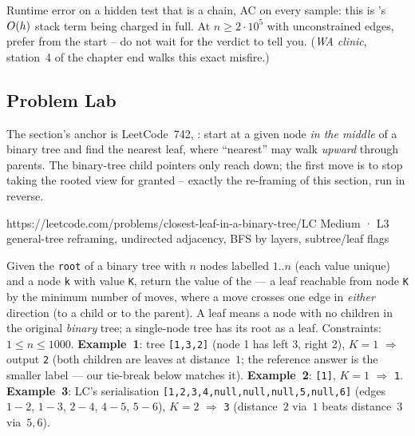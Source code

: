 \begin{warningbox}
Runtime error on a hidden test that is a chain, AC on every sample: this is
's $O(h)$ stack term being charged in full. At
$n \ge 2\cdot 10^{5}$ with unconstrained edges, prefer  from the start
-- do not wait for the verdict to tell you. \hfill(\emph{WA clinic}, station~4
of the chapter end walks this exact misfire.)
\end{warningbox}

\subsection{Problem Lab}

The section's anchor is LeetCode~742, : start at a given node \emph{in
the middle} of a binary tree and find the nearest leaf, where ``nearest'' may walk
\emph{upward} through parents. The binary-tree child pointers only reach down; the first
move is to stop taking the rooted view for granted -- exactly the re-framing of this
section, run in reverse.

  {https://leetcode.com/problems/closest-leaf-in-a-binary-tree/}{LC Medium · L3}
  {general-tree reframing, undirected adjacency, BFS by layers, subtree/leaf flags}

\begin{problemstatement}
Given the \texttt{root} of a binary tree with $n$ nodes labelled $1..\text{}n$ (each
value unique) and a node \texttt{k} with value \texttt{K}, return the value of the
 --- a leaf reachable from node \texttt{K} by the minimum number of
moves, where a move crosses one edge in \emph{either} direction (to a child or to the
parent). A leaf means a node with no children in the original \emph{binary} tree; a
single-node tree has its root as a leaf. Constraints: $1 \le n \le 1000$.
\textbf{Example~1}: tree \texttt{[1,3,2]} (node 1 has left 3, right 2), $K=1$
$\Rightarrow$ output \texttt{2} (both children are leaves at distance~$1$; the reference
answer is the smaller label --- our tie-break below matches it). \textbf{Example~2}:
\texttt{[1]}, $K=1$ $\Rightarrow$ \texttt{1}. \textbf{Example~3}: LC's serialisation
\texttt{[1,2,3,4,null,null,null,5,null,6]} (edges $1\!-\!2$, $1\!-\!3$, $2\!-\!4$,
$4\!-\!5$, $5\!-\!6$), $K=2$ $\Rightarrow$ \texttt{3} (distance~$2$ via~$1$ beats
distance~$3$ via~$5,6$).
\end{problemstatement}

